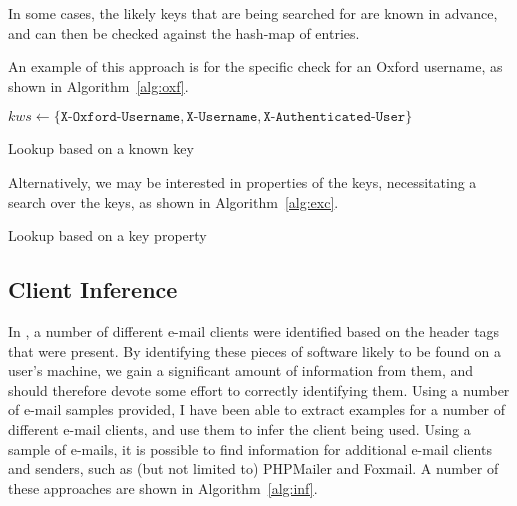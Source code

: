 In some cases, the likely keys that are being searched for are known in
advance, and can then be checked against the hash-map of entries.

An example of this approach is for the specific check for an Oxford username,
as shown in Algorithm~\ref{alg:oxf}.

\begin{algorithm}
$kws \gets \{\texttt{X-Oxford-Username}, \texttt{X-Username}, \texttt{X-Authenticated-User}\}$\;
	\caption{Lookup based on a known key}
	\label{alg:oxf}
\end{algorithm}

Alternatively, we may be interested in properties of the keys, necessitating a search over the keys, as shown in Algorithm~\ref{alg:exc}.

\begin{algorithm}
	\caption{Lookup based on a key property}
	\label{alg:exc}
\end{algorithm}

\subsection{Client Inference}

In \cite{nurse2015investigating}, a number of different e-mail clients were
identified based on the header tags that were present. By identifying these
pieces of software likely to be found on a user's machine, we gain a
significant amount of information from them, and should therefore devote some
effort to correctly identifying them.  Using a number of e-mail samples
provided, I have been able to extract examples for a number of different e-mail
clients, and use them to infer the client being used.  Using a sample of
e-mails, it is possible to find information for additional e-mail clients and
senders, such as (but not limited to) PHPMailer and Foxmail.  A number of these
approaches are shown in Algorithm~\ref{alg:inf}.

